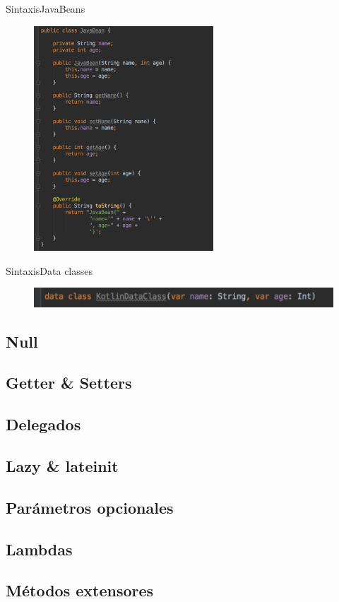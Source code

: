 \begin{frame}{Sintaxis}{JavaBeans}
    \begin{figure}[h]
    \centering
    \includegraphics[width=0.6\textwidth]{images/kotlin_vs_java/java_bean}
    \end{figure}
\end{frame}

\begin{frame}{Sintaxis}{Data classes}
    \begin{figure}[h]
    \centering
    \includegraphics[width=\textwidth]{images/kotlin_vs_java/kotlin_data_class}
    \end{figure}
\end{frame}

\subsection{Null}
\subsection{Getter \& Setters}
\subsection{Delegados}
\subsection{Lazy \& lateinit}
\subsection{Parámetros opcionales}
\subsection{Lambdas}
\subsection{Métodos extensores}
